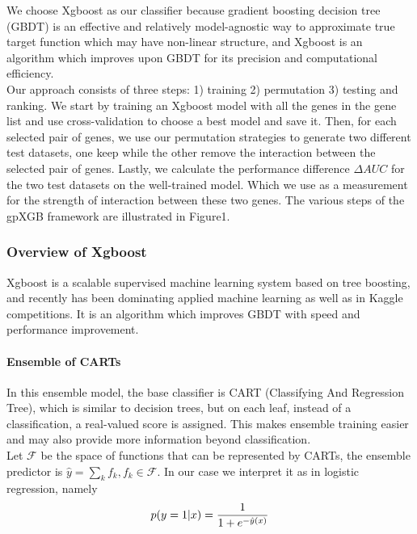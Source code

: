\documentclass[11pt]{article}
\theoremstyle{plain}
\theoremstyle{definition}
\theoremstyle{remark}
\begin{document}
We choose Xgboost as our classifier because gradient boosting decision tree (GBDT) is an effective and relatively model-agnostic way to approximate true target function which may have non-linear structure, and Xgboost is an algorithm which improves upon GBDT for its precision and computational efficiency.\\

Our approach consists of three steps: 1) training 2) permutation 3) testing and ranking. We start by training an Xgboost model with all the genes in the gene list and use cross-validation to choose a best model and save it. Then, for each selected pair of genes, we use our permutation strategies to generate two different test datasets, one keep while the other remove the interaction between the selected pair of genes. Lastly, we calculate the performance difference $\Delta AUC$ for the two test datasets on the well-trained model. Which we use as a measurement for the strength of interaction between these two genes. The various steps of the gpXGB framework are illustrated in Figure1.

\subsubsection{Overview of Xgboost}

Xgboost \cite{9} is a scalable supervised machine learning system based on tree boosting, and recently has been dominating applied machine learning as well as in Kaggle competitions. It is an algorithm which improves GBDT with speed and performance improvement.

\paragraph{Ensemble of CARTs}
In this ensemble model, the base classifier is CART (Classifying And Regression Tree), which is similar to decision trees, but on each leaf, instead of a classification, a real-valued score is assigned. This makes ensemble training easier and may also provide more information beyond classification.\\

Let $\mathcal{F}$ be the space of functions that can be represented by CARTs, the ensemble predictor is $\hat{y}=\sum_k f_k, f_k\in\mathcal{F}$. In our case we interpret it as in logistic regression, namely
\begin{equation}
p(y=1|x)={1\over 1+e^{-\hat{y}(x)}}
\end{equation}
\end{document}
